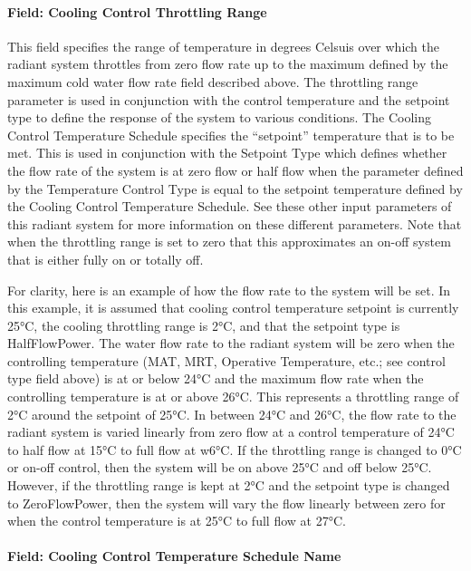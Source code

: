 \paragraph{Field: Cooling Control Throttling Range}\label{field-cooling-control-throttling-range}

This field specifies the range of temperature in degrees Celsuis over which the radiant system throttles from zero flow rate up to the maximum defined by the maximum cold water flow rate field described above. The throttling range parameter is used in conjunction with the control temperature and the setpoint type to define the response of the system to various conditions. The Cooling Control Temperature Schedule specifies the ``setpoint'' temperature that is to be met.  This is used in conjunction with the Setpoint Type which defines whether the flow rate of the system is at zero flow or half flow when the parameter defined by the Temperature Control Type is equal to the setpoint temperature defined by the Cooling Control Temperature Schedule.  See these other input parameters of this radiant system for more information on these different parameters.  Note that when the throttling range is set to zero that this approximates an on-off system that is either fully on or totally off.

For clarity, here is an example of how the flow rate to the system will be set.  In this example, it is assumed that cooling control temperature setpoint is currently 25°C, the cooling throttling range is 2°C, and that the setpoint type is HalfFlowPower.  The water flow rate to the radiant system will be zero when the controlling temperature (MAT, MRT, Operative Temperature, etc.; see control type field above) is at or below 24°C and the maximum flow rate when the controlling temperature is at or above 26°C. This represents a throttling range of 2°C around the setpoint of 25°C. In between 24°C and 26°C, the flow rate to the radiant system is varied linearly from zero flow at a control temperature of 24°C to half flow at 15°C to full flow at w6°C.  If the throttling range is changed to 0°C or on-off control, then the system will be on above 25°C and off below 25°C.  However, if the throttling range is kept at 2°C and the setpoint type is changed to ZeroFlowPower, then the system will vary the flow linearly between zero for when the control temperature is at 25°C to full flow at 27°C.

\paragraph{Field: Cooling Control Temperature Schedule Name}\label{field-cooling-control-temperature-schedule-name}

